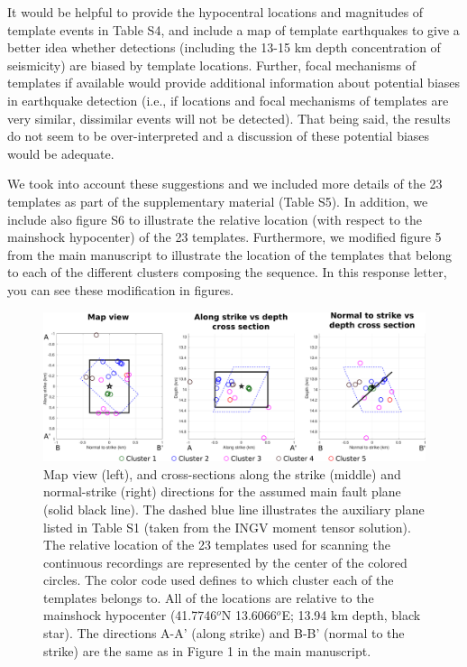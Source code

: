 \documentclass[10pt]{extarticle}
\begin{document}
\begin{ReviewerComment}{1}
\noindent 
It would be helpful to provide the hypocentral locations and magnitudes of template events in Table S4, and include a map of template earthquakes to give a better idea whether detections (including the 13-15 km depth concentration of seismicity) are biased by template locations. Further, focal mechanisms of templates if available would provide additional information about potential biases in earthquake detection (i.e., if locations and focal mechanisms of templates are very similar, dissimilar events will not be detected). That being said, the results do not seem to be over-interpreted and a discussion of these potential biases would be adequate.

\end{ReviewerComment}


\begin{Answer}
We took into account these suggestions and we included more details of the 23 templates as part of the supplementary material (Table S5). In addition, we include also figure S6 to illustrate the relative location (with respect to the mainshock hypocenter) of the 23 templates. Furthermore, we modified figure 5 from the main manuscript to illustrate the location of the templates that belong to each of the different clusters composing the sequence. In this response letter, you can see these modification in figures.
\begin{figure}[!h]
\begin{center}
 \includegraphics[width=1\linewidth]{S6_templates_per_cluster_map.pdf} 
\end{center}
\caption{Map view (left), and cross-sections along the strike (middle) and normal-strike (right) directions for the assumed main fault plane (solid black line). The dashed blue line illustrates the auxiliary plane listed in Table S1 (taken from the INGV moment tensor solution). The relative location of the 23 templates used for scanning the continuous recordings are represented by the center of the colored circles. The color code used defines to which cluster each of the templates belongs to. All of the locations are relative to the mainshock hypocenter (41.7746$^o$N 13.6066$^o$E; 13.94 km depth, black star). The directions A-A' (along strike) and B-B' (normal to the strike) are the same as in Figure 1 in the main manuscript.}
\label{fig:S6_templates_map}
\end{figure}
 \WorkInProgressRevTask
\end{Answer}
%
%
\end{document}
